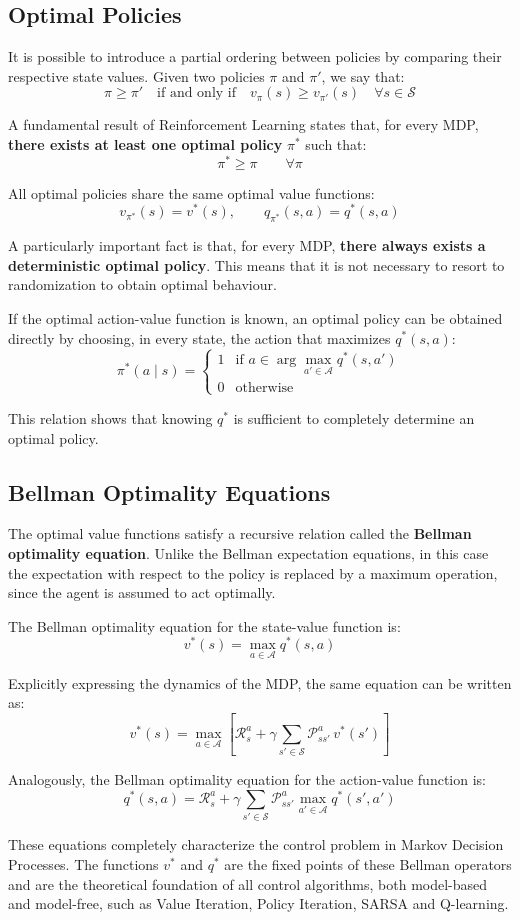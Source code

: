 \subsection{Optimal Policies}

It is possible to introduce a partial ordering between policies by comparing their respective state values. Given two policies $\pi$ and $\pi'$, we say that:
\[
\pi \ge \pi'
\quad \text{if and only if} \quad
v_\pi(s) \ge v_{\pi'}(s) \quad \forall s \in \mathcal{S}
\]

A fundamental result of Reinforcement Learning states that, for every MDP, \textbf{there exists at least one optimal policy} $\pi^*$ such that:
\[
\pi^* \ge \pi \qquad \forall \pi
\]

All optimal policies share the same optimal value functions:
\[
v_{\pi^*}(s) = v^*(s),
\qquad
q_{\pi^*}(s,a) = q^*(s,a)
\]

A particularly important fact is that, for every MDP, \textbf{there always exists a deterministic optimal policy}. This means that it is not necessary to resort to randomization to obtain optimal behaviour.

If the optimal action-value function is known, an optimal policy can be obtained directly by choosing, in every state, the action that maximizes $q^*(s,a)$:
\[
\pi^*(a \mid s) =
\begin{cases}
1 & \text{if } a \in \arg\max_{a' \in \mathcal{A}} q^*(s,a') \\
0 & \text{otherwise}
\end{cases}
\]

This relation shows that knowing $q^*$ is sufficient to completely determine an optimal policy.


\subsection{Bellman Optimality Equations}

The optimal value functions satisfy a recursive relation called the \textbf{Bellman optimality equation}. Unlike the Bellman expectation equations, in this case the expectation with respect to the policy is replaced by a maximum operation, since the agent is assumed to act optimally.

The Bellman optimality equation for the state-value function is:
\[
v^*(s) = \max_{a \in \mathcal{A}} q^*(s,a)
\]

Explicitly expressing the dynamics of the MDP, the same equation can be written as:
\[
v^*(s)
=
\max_{a \in \mathcal{A}}
\left[
\mathcal{R}_s^a
+
\gamma
\sum_{s' \in \mathcal{S}}
\mathcal{P}_{ss'}^a \, v^*(s')
\right]
\]

Analogously, the Bellman optimality equation for the action-value function is:
\[
q^*(s,a)
=
\mathcal{R}_s^a
+
\gamma
\sum_{s' \in \mathcal{S}}
\mathcal{P}_{ss'}^a
\max_{a' \in \mathcal{A}} q^*(s',a')
\]

These equations completely characterize the control problem in Markov Decision Processes. The functions $v^*$ and $q^*$ are the fixed points of these Bellman operators and are the theoretical foundation of all control algorithms, both model-based and model-free, such as Value Iteration, Policy Iteration, SARSA and Q-learning.
